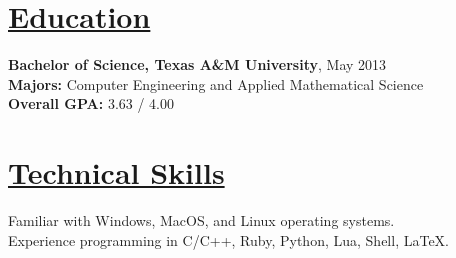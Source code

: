 \documentclass[8pt]{res}
\begin{document}
 

  \address{\bf \underline{Current Address}\\216 Southpoint Crossing Dr.\\Durham, NC 27713}
  \address{\bf \underline{Contact Info}\\juanlb1988@gmail.com\\(254)-449-6995}

  \begin{resume}


    \section{\underline{Education}}          
    \textbf{Bachelor of Science, Texas A\&M University}, May 2013   \\       
    \textbf{Majors:} Computer Engineering and Applied Mathematical Science \\
    \textbf{Overall GPA:} 3.63 / 4.00     


    \section{\underline{Technical Skills}}        
    Familiar with Windows, MacOS, and Linux operating systems. \\
    Experience programming in C/C++, Ruby, Python, Lua, Shell, \LaTeX.



\end{resume}
\end{document}
